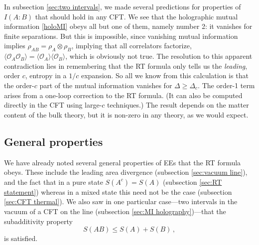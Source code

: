 \documentclass[11pt]{article}
\newcommand{\ev}[1]{\langle{#1}\rangle}
\begin{document}
In subsection \ref{sec:two intervals}, we made several predictions for properties of $I(A:B)$ that should hold in any CFT. We see that the holographic mutual information \eqref{holoMI} obeys all but one of them, namely number 2: it vanishes for finite separations. But this is impossible, since vanishing mutual information implies $\rho_{AB}=\rho_A\otimes\rho_B$, implying that all correlators factorize, $\ev{\mathcal{O}_A\mathcal{O}_B}=\ev{\mathcal{O}_A}\ev{\mathcal{O}_B}$, which is obviously not true. The resolution to this apparent contradiction lies in remembering that the RT formula only tells us the \emph{leading}, order $c$, entropy in a $1/c$ expansion. So all we know from this calculation is that the order-$c$ part of the mutual information vanishes for $\Delta\ge\Delta_c$. The order-1 term arises from a one-loop correction to the RT formula. (It can also be computed directly in the CFT using large-$c$ techniques.) The result depends on the matter content of the bulk theory, but it is non-zero in any theory, as we would expect.



\subsection{General properties}
\label{sec:RT properties}

We have already noted several general properties of EEs that the RT formula obeys. These include the leading area divergence (subsection \ref{sec:vacuum line}), and the fact that in a pure state $S(A^c)=S(A)$ (subsection \ref{sec:RT statement}) whereas in a mixed state this need not be the case (subsection \ref{sec:CFT thermal}). We also saw in one particular case---two intervals in the vacuum of a CFT on the line (subsection \ref{sec:MI holography})---that the subadditivity property
\begin{equation}\label{subadditivity2}
S(AB)\le S(A)+S(B)\,,
\end{equation}
is satisfied.
\end{document}
